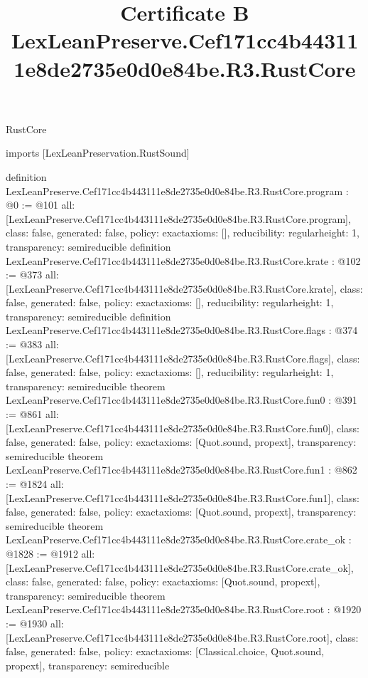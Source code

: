 \begin{lexlean}{RustCore}
\title{Certificate B LexLeanPreserve.Cef171cc4b443111e8de2735e0d0e84be.R3.RustCore}
\begin{coremodule}
imports [LexLeanPreservation.RustSound]

definition LexLeanPreserve.Cef171cc4b443111e8de2735e0d0e84be.R3.RustCore.program : @0 := @101 {
  all: [LexLeanPreserve.Cef171cc4b443111e8de2735e0d0e84be.R3.RustCore.program],
  class: false,
  generated: false,
  policy: exact{axioms: []},
  reducibility: regular{height: 1},
  transparency: semireducible
}
definition LexLeanPreserve.Cef171cc4b443111e8de2735e0d0e84be.R3.RustCore.krate : @102 := @373 {
  all: [LexLeanPreserve.Cef171cc4b443111e8de2735e0d0e84be.R3.RustCore.krate],
  class: false,
  generated: false,
  policy: exact{axioms: []},
  reducibility: regular{height: 1},
  transparency: semireducible
}
definition LexLeanPreserve.Cef171cc4b443111e8de2735e0d0e84be.R3.RustCore.flags : @374 := @383 {
  all: [LexLeanPreserve.Cef171cc4b443111e8de2735e0d0e84be.R3.RustCore.flags],
  class: false,
  generated: false,
  policy: exact{axioms: []},
  reducibility: regular{height: 1},
  transparency: semireducible
}
theorem LexLeanPreserve.Cef171cc4b443111e8de2735e0d0e84be.R3.RustCore.fun0 : @391 := @861 {
  all: [LexLeanPreserve.Cef171cc4b443111e8de2735e0d0e84be.R3.RustCore.fun0],
  class: false,
  generated: false,
  policy: exact{axioms: [Quot.sound, propext]},
  transparency: semireducible
}
theorem LexLeanPreserve.Cef171cc4b443111e8de2735e0d0e84be.R3.RustCore.fun1 : @862 := @1824 {
  all: [LexLeanPreserve.Cef171cc4b443111e8de2735e0d0e84be.R3.RustCore.fun1],
  class: false,
  generated: false,
  policy: exact{axioms: [Quot.sound, propext]},
  transparency: semireducible
}
theorem LexLeanPreserve.Cef171cc4b443111e8de2735e0d0e84be.R3.RustCore.crate_ok : @1828 := @1912 {
  all: [LexLeanPreserve.Cef171cc4b443111e8de2735e0d0e84be.R3.RustCore.crate_ok],
  class: false,
  generated: false,
  policy: exact{axioms: [Quot.sound, propext]},
  transparency: semireducible
}
theorem LexLeanPreserve.Cef171cc4b443111e8de2735e0d0e84be.R3.RustCore.root : @1920 := @1930 {
  all: [LexLeanPreserve.Cef171cc4b443111e8de2735e0d0e84be.R3.RustCore.root],
  class: false,
  generated: false,
  policy: exact{axioms: [Classical.choice, Quot.sound, propext]},
  transparency: semireducible
}


\end{coremodule}
\end{lexlean}
